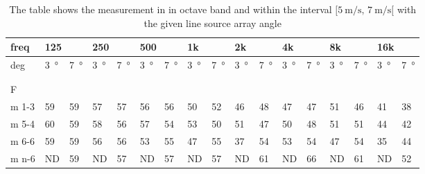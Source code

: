 \begin{table}[]
\centering
\caption{The table shows the measurement in in octave band and within the interval $[\SI{5}{\meter\per\second},\, \SI{7}{\meter\per\second}[ $ with the given line source array angle}
\begin{tabular}{l|l|l|l|l|l|l|l|l|l|l|l|l|l|l|ll}
freq & \multicolumn{2}{l|}{125} & \multicolumn{2}{l|}{250} & \multicolumn{2}{l|}{500} & \multicolumn{2}{l|}{1k} & \multicolumn{2}{l|}{2k} & \multicolumn{2}{l|}{4k} & \multicolumn{2}{l|}{8k} & \multicolumn{2}{l}{16k}  \\ \hline
deg  &     \SI{3}{\degree}        &    \SI{7}{\degree}          &     \SI{3}{\degree}          &   \SI{7}{\degree}           &       \SI{3}{\degree}        &      \SI{7}{\degree}        &     \SI{3}{\degree}         &     \SI{7}{\degree}         &       \SI{3}{\degree}       &    \SI{7}{\degree}          &      \SI{3}{\degree}        &        \SI{7}{\degree}      &      \SI{3}{\degree}        &       \SI{7}{\degree}       & \multicolumn{1}{l|}{ \SI{3}{\degree} } &  \SI{7}{\degree}  \\ \hline
 & \multicolumn{2}{l|}{} & \multicolumn{2}{l|}{} & \multicolumn{2}{l|}{} & \multicolumn{2}{l|}{} & \multicolumn{2}{l|}{} & \multicolumn{2}{l|}{}& \multicolumn{2}{l|}{}& \multicolumn{2}{l}{}     \\ 
\multicolumn{17}{l}{ } \\   
F & \multicolumn{2}{l|}{} & \multicolumn{2}{l|}{} & \multicolumn{2}{l|}{} & \multicolumn{2}{l|}{} & \multicolumn{2}{l|}{} & \multicolumn{2}{l|}{}& \multicolumn{2}{l|}{}& \multicolumn{2}{l}{}     \\ \hline
m 1-3  &     59   &      59  &   57    &  57      &        56     &    56       &  50       &    52        &    46         &    48        &      47       &     47       &      51      &    46        & \multicolumn{1}{l|}{41} &  38\\
m 5-4   &    60  &       59  &      58  & 56     &       57      &     54      &   53     &     50       &    51         &     47       &      50       &     48       &       51     &       51     & \multicolumn{1}{l|}{44} &  42\\
m 6-6   &    59  &      59   &     56   &   56    &      53       &     55      &  47       &     55       &     37        &      54      &        53     &       54     &       47     &       54     & \multicolumn{1}{l|}{35} & 44 \\
m n-6   &    ND  &      59   &   ND  &   57     &   ND        &     57      &    ND     &     57       &      ND      &       61     &      ND      &       66     &        ND   &       61     & \multicolumn{1}{l|}{ND} &  52\\

\end{tabular}
\end{table}
